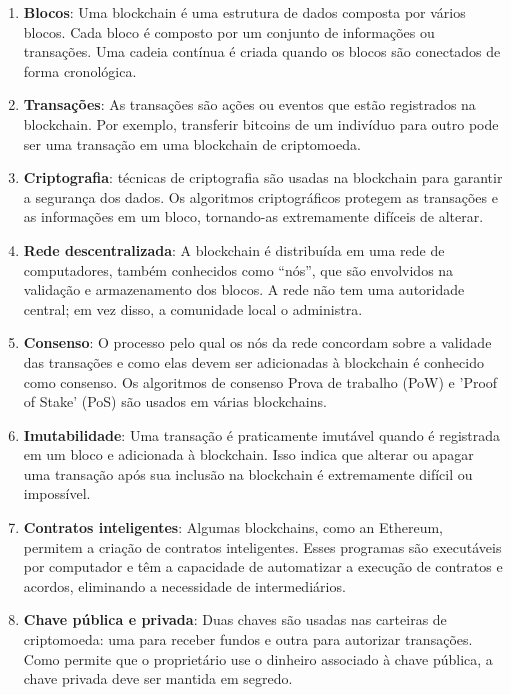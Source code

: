 \documentclass[a4paper,12pt]{article}
\begin{document}
\begin{enumerate}
    \item \textbf{Blocos}: Uma blockchain é uma estrutura de dados composta por vários blocos. Cada bloco é composto 
    por um conjunto de informações ou transações. Uma cadeia contínua é criada quando os blocos são 
    conectados de forma cronológica.

    \item \textbf{Transações}: As transações são ações ou eventos que estão registrados na blockchain. Por exemplo, 
    transferir bitcoins de um indivíduo para outro pode ser uma transação em uma blockchain de criptomoeda.
    
    \item \textbf{Criptografia}: técnicas de criptografia são usadas na blockchain para garantir a segurança dos dados. 
    Os algoritmos criptográficos protegem as transações e as informações em um bloco, tornando-as 
    extremamente difíceis de alterar.

    \item \textbf{Rede descentralizada}: A blockchain é distribuída em uma rede de computadores, também conhecidos 
    como ``nós'', que são envolvidos na validação e armazenamento dos blocos. A rede não tem uma autoridade 
    central; em vez disso, a comunidade local o administra.

    \item \textbf{Consenso}: O processo pelo qual os nós da rede concordam sobre a validade das transações e 
    como elas devem ser adicionadas à blockchain é conhecido como consenso. Os algoritmos de consenso 
    Prova de trabalho (PoW) e 'Proof of Stake' (PoS) são usados em várias blockchains.

    \item \textbf{Imutabilidade}: Uma transação é praticamente imutável quando é registrada em um bloco e 
    adicionada à blockchain. Isso indica que alterar ou apagar uma transação após sua inclusão 
    na blockchain é extremamente difícil ou impossível.

    \item \textbf{Contratos inteligentes}: Algumas blockchains, como an Ethereum, permitem a criação de contratos 
    inteligentes. Esses programas são executáveis por computador e têm a capacidade de automatizar a
     execução de contratos e acordos, eliminando a necessidade de intermediários.

     \item \textbf{Chave pública e privada}: Duas chaves são usadas nas carteiras de criptomoeda: uma para 
     receber fundos e outra para autorizar transações. Como permite que o proprietário use o dinheiro associado 
     à chave pública, a chave privada deve ser mantida em segredo.


\end{enumerate}
\end{document}

